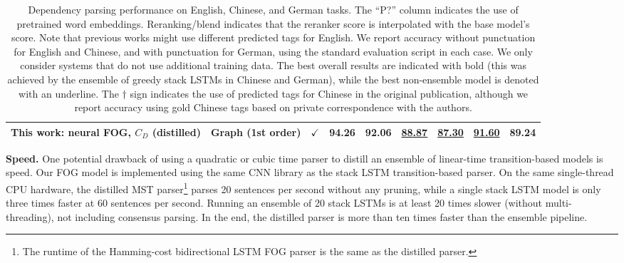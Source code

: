 \documentclass[11pt,letterpaper]{article}
\newcommand{\ignore}[1]{}
\newcommand{\adhicomment}[1]{\ignore{\textcolor{green}{{\textbf{[#1 --\textsc{adhi}]}}}}}
\newcommand{\cjd}[1]{\textcolor{cyan}{\ignore{{\textbf{[#1 --\textsc{cjd}]}}}}}
\newcommand{\nascomment}[1]{\ignore{\textcolor{blue}{{\textbf{[#1 --\textsc{nas}]}}}}}
\newcommand{\miguelcomment}[1]{\ignore{\textcolor{red}{{\textbf{[#1 --\textsc{miguel}]}}}}}
\begin{document}
\begin{table*}[!ht]
{\begin{tabular}{|l|l|c|l|l|l|l|l|l|}
This work:  neural FOG, $C_D$ (distilled)     & Graph (1st order)                & $\checkmark$                                                                                     & 94.26             & 92.06            & \underline{88.87}  & \underline{87.30}  & \underline{91.60}                                           & 89.24  \\ \hline                                         
\end{tabular}
}
  \caption{Dependency parsing performance on English, Chinese, and German tasks.  The ``P?'' column indicates the use of pretrained word embeddings. Reranking/blend indicates that the reranker score is interpolated with the base model's score. Note that previous works might use different predicted tags for English. We report accuracy without punctuation for English and Chinese, and with punctuation for German, using the standard evaluation script in each case. We only consider systems that do not use additional training data. The best overall results are indicated with bold (this was achieved by the ensemble of greedy stack LSTMs in Chinese and German), while the best non-ensemble model is denoted with an underline. The $\dagger$ sign indicates the use of predicted tags for Chinese in the original publication, although we report accuracy using gold Chinese tags based on private correspondence with the authors. \ignore{$^\ast$Chinese results for these models are not directly comparable since they used predicted tags, while we follow more recent lines of work and use gold ones \protect \cite{stack_lstm,kiperwasser}.}\ignore{\miguelcomment{say who we follow better...}} \ignore{\miguelcomment{which ones? the relaxed ones? Not sure if I understand. If they are the relaxed ones, just leave the box empty, we don't have that numbers in the paper.}} \ignore{\nascomment{issue with the dagger?} \adhicomment{Resolved}
}}
  \label{tab:full_results}\ignore{\cjd{I think it's a bad idea to leave out the non-relaxed ensemble results}}
\end{table*}

\textbf{Speed.} One potential drawback of using a quadratic or cubic time parser to distill an ensemble of linear-time transition-based models is speed. 
Our FOG model is implemented using the same CNN library as the stack LSTM transition-based parser.
On the same single-thread CPU hardware, the distilled MST parser\footnote{The runtime of the Hamming-cost bidirectional LSTM FOG parser is the same as the distilled parser.}  parses 20 sentences per second without any pruning, while a single stack LSTM model is only three times faster at 60 sentences per second. Running an ensemble of 20 stack LSTMs is at least 20 times slower (without multi-threading), not including consensus parsing.
In the end, the distilled parser is more than ten times \ignore{\nascomment{I don't like that phrasing; just give a number like ``ten times"}}faster than the ensemble pipeline.
\end{document}
